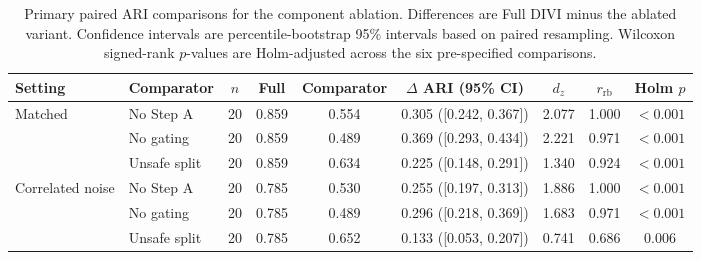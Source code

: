 \begin{table}[t]
\centering
\footnotesize
\setlength{\tabcolsep}{4pt}
\caption{Primary paired ARI comparisons for the component ablation. Differences are Full DIVI minus the ablated variant. Confidence intervals are percentile-bootstrap 95\% intervals based on paired resampling. Wilcoxon signed-rank $p$-values are Holm-adjusted across the six pre-specified comparisons.}
\label{tab:component_ablation_paired}
\begin{tabular}{llccccccc}
\toprule
Setting & Comparator & $n$ & Full & Comparator & $\Delta$ ARI (95\% CI) & $d_z$ & $r_{\mathrm{rb}}$ & Holm $p$ \\
\midrule
Matched & No Step A & 20 & 0.859 & 0.554 & 0.305 ([0.242, 0.367]) & 2.077 & 1.000 & $<0.001$ \\
 & No gating & 20 & 0.859 & 0.489 & 0.369 ([0.293, 0.434]) & 2.221 & 0.971 & $<0.001$ \\
 & Unsafe split & 20 & 0.859 & 0.634 & 0.225 ([0.148, 0.291]) & 1.340 & 0.924 & $<0.001$ \\
\addlinespace
Correlated noise & No Step A & 20 & 0.785 & 0.530 & 0.255 ([0.197, 0.313]) & 1.886 & 1.000 & $<0.001$ \\
 & No gating & 20 & 0.785 & 0.489 & 0.296 ([0.218, 0.369]) & 1.683 & 0.971 & $<0.001$ \\
 & Unsafe split & 20 & 0.785 & 0.652 & 0.133 ([0.053, 0.207]) & 0.741 & 0.686 & 0.006 \\
\bottomrule
\end{tabular}
\end{table}
